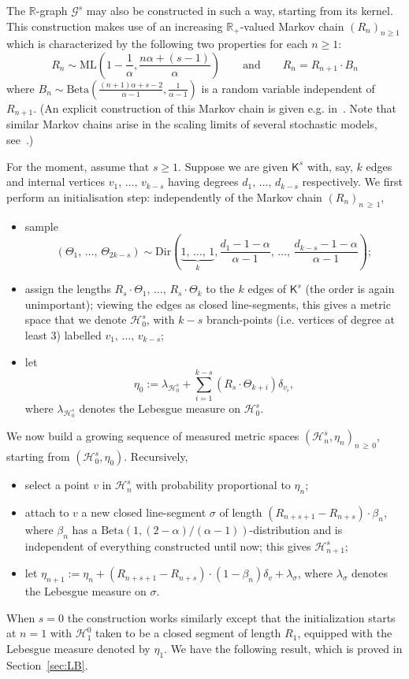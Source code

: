 \documentclass[AHL,Unicode,longabstracts,published]{cedram}
\newcommand{\Betal}{\mathrm{Beta}}
\newcommand{\ML}{\mathrm{ML}}
\newcommand{\Dir}{\mathrm{Dir}}
\newcommand{\cG}{\mathcal{G}}
\newcommand{\cH}{\mathcal{H}}
\newcommand{\sK}{\mathsf{K}}
\newcommand{\R}{\mathbb{R}}
\newcommand{\R}{\mathbb{R}}
\begin{document}
The $\R$-graph $\cG^s$ may also be constructed in such a way, starting from its kernel. This construction makes use of an increasing $\R_+$-valued Markov chain $(R_n)_{n \geq 1}$ which is characterized by the following two properties for each $n \geq 1$:
\[
R_n \sim \ML\left(1-\frac{1}{\alpha},\frac{n\alpha+(s-1)}{\alpha}\right) \quad \quad \text{and} \quad \quad R_n=R_{n+1} \cdot B_n
\]
where $B_n \sim \Betal(\frac{(n+1)\alpha+s-2}{\alpha-1},\frac{1}{\alpha-1})$ is a random variable independent of $R_{n+1}$. (An explicit construction of this Markov chain is given e.g. in~\cite[Section~1.2]{GHlinebreaking}. Note that similar Markov chains arise in the scaling limits of several stochastic models, see~\cite{Lancelot15, Sen19+_geometry}.)

For the moment, assume that $s\geq 1$. Suppose we are given $\sK^s$ with, say, $k$ edges and internal vertices $v_1,\,\ldots,\,v_{k-s}$ having degrees $d_1,\,\ldots,\,d_{k-s}$ respectively. We first perform an initialisation step: independently of the Markov chain $(R_n)_{n\,\geq\,1}$,
\begin{itemize}
\item sample
\[
\left(\Theta_1,\,\ldots,\,\Theta_{2k-s}\right) \sim \Dir\left(\underbrace{1,\,\ldots,\,1}_k,\frac{d_1-1-\alpha}{\alpha-1},\,\ldots,\,\frac{d_{k-s}-1-\alpha}{\alpha-1}\right);
\]
\item assign the lengths $R_s\cdot \Theta_1,\,\ldots,\,R_s \cdot \Theta_k$ to the $k$ edges of $\sK^s$ (the order is again unimportant); viewing the edges as closed line-segments, this gives a metric space that we denote $\cH^s_0$, with $k-s$ branch-points (i.e. vertices of degree at least 3) labelled $v_1,\,\ldots,\,v_{k-s}$;
\item let
\[
\eta_0:=\lambda_{\cH^s_0}+\sum_{i=1}^{k-s}\left(R_s \cdot \Theta_{k+i}\right)\delta_{v_i},
\]
where $\lambda_{\cH^s_0}$ denotes the Lebesgue measure on $\cH^s_0$.
\end{itemize}

We now build a growing sequence of measured metric spaces $(\cH^s_{n},\eta_n)_{n\,\geq\,0}$, starting from $(\cH^s_{0},\eta_0)$. Recursively,
\begin{itemize}
\item select a point $v$ in $\cH^s_{n}$ with probability proportional to $\eta_n$;
\item attach to $v$ a new closed line-segment $\sigma$ of length $(R_{n+s+1}-R_{n+s}) \cdot \beta_n$, where $\beta_n$ has a $\Betal(1,(2-\alpha)/(\alpha-1))$-distribution and is independent of everything constructed until now; this gives $\cH_{n+1}^s$;
\item let $\eta_{n+1}:=\eta_n+ (R_{n+s+1}-R_{n+s}) \cdot (1-\beta_n) \delta_{v}+\lambda_{\sigma}$, where $\lambda_{\sigma}$ denotes the Lebesgue measure on $\sigma$.
\end{itemize}
When $s=0$ the construction works similarly except that the initialization starts at $n=1$ with $\cH^0_1$ taken to be a closed segment of length $R_1$, equipped with the Lebesgue measure denoted by $\eta_1$. We have the following result, which is proved in Section~\ref{sec:LB}.
\end{document}
